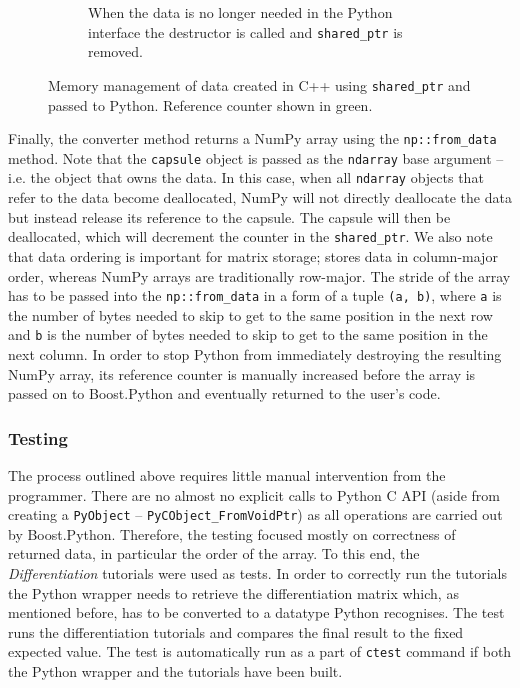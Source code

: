 \begin{figure}[h!]
\begin{subfigure}{0.6\textwidth}
        \caption{When the data is no longer needed in the Python interface the destructor is 
        called and \texttt{shared\_ptr} is removed.}
        \label{fig:c_to_python_d}
    \end{subfigure}
    \caption{Memory management of data created in C++ using \texttt{shared\_ptr} and passed 
    to Python. Reference counter shown in green.}
    \label{fig:c_to_python}
\end{figure}

Finally, the converter method returns a NumPy array using the
\texttt{np::from\_data} method. Note that the \texttt{capsule} object is passed
as the \texttt{ndarray} base argument -- i.e. the object that owns the data. In
this case, when all \texttt{ndarray} objects that refer to the data become
deallocated, NumPy will not directly deallocate the data but instead release its
reference to the capsule. The capsule will then be deallocated, which will
decrement the counter in the \texttt{shared\_ptr}. We also note that data
ordering is important for matrix storage; \nek{} stores data in column-major
order, whereas NumPy arrays are traditionally row-major.  The stride of the
array has to be passed into the \texttt{np::from\_data} in a form of a tuple
\texttt{(a, b)}, where \texttt{a} is the number of bytes needed to skip to get
to the same position in the next row and \texttt{b} is the number of bytes
needed to skip to get to the same position in the next column. In order to stop
Python from immediately destroying the resulting NumPy array, its reference
counter is manually increased before the array is passed on to Boost.Python and
eventually returned to the user's code.

\subsubsection{Testing}

The process outlined above requires little manual intervention from the
programmer. There are no almost no explicit calls to Python C API (aside from
creating a \texttt{PyObject} -- \texttt{PyCObject\_FromVoidPtr}) as all
operations are carried out by Boost.Python. Therefore, the testing focused
mostly on correctness of returned data, in particular the order of the array. To
this end, the \emph{Differentiation} tutorials were used as tests. In order to
correctly run the tutorials the Python wrapper needs to retrieve the
differentiation matrix which, as mentioned before, has to be converted to a
datatype Python recognises. The test runs the differentiation tutorials and
compares the final result to the fixed expected value. The test is automatically
run as a part of \texttt{ctest} command if both the Python wrapper and the
tutorials have been built.

